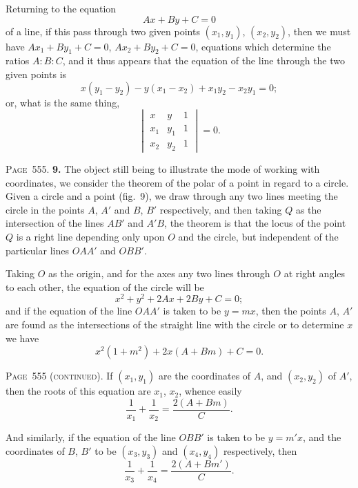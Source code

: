 \documentclass[11pt,a4paper]{book}
\begin{document}
Returning to the equation
\[
Ax+By+C=0
\]
of a line, if this pass through two given points $(x_1,y_1)$, $(x_2,y_2)$, then we must have $Ax_1+By_1+C=0$, $Ax_2+By_2+C=0$, equations which determine the ratios $A:B:C$, and it thus appears that the equation of the line through the two given points is
\[
x(y_1-y_2) - y(x_1-x_2) + x_1y_2 - x_2y_1 = 0;
\]
or, what is the same thing,
\[
\begin{vmatrix}
x & y & 1 \\
x_1 & y_1 & 1 \\
x_2 & y_2 & 1
\end{vmatrix} = 0.
\]

\newpage
\noindent\textsc{Page~555.} \textbf{9.} The object still being to illustrate the mode of working with coordinates, we consider the theorem of the polar of a point in regard to a circle. Given a circle and a point (fig.~9), we draw through any two lines meeting the circle in the points $A$, $A'$ and $B$, $B'$ respectively, and then taking $Q$ as the intersection of the lines $AB'$ and $A'B$, the theorem is that the locus of the point $Q$ is a right line depending only upon $O$ and the circle, but independent of the particular lines $OAA'$ and $OBB'$.

Taking $O$ as the origin, and for the axes any two lines through $O$ at right angles to each other, the equation of the circle will be
\[
x^2 + y^2 + 2Ax + 2By + C = 0;
\]
and if the equation of the line $OAA'$ is taken to be $y=mx$, then the points $A$, $A'$ are found as the intersections of the straight line with the circle or to determine $x$ we have
\[
x^2(1+m^2) + 2x(A+Bm) + C = 0.
\]

\noindent\textsc{Page~555 (continued).} If $(x_1,y_1)$ are the coordinates of $A$, and $(x_2,y_2)$ of $A'$, then the roots of this equation are $x_1$, $x_2$, whence easily
\[
\frac{1}{x_1} + \frac{1}{x_2} = \frac{2(A+Bm)}{C}.
\]

And similarly, if the equation of the line $OBB'$ is taken to be $y=m'x$, and the coordinates of $B$, $B'$ to be $(x_3,y_3)$ and $(x_4,y_4)$ respectively, then
\[
\frac{1}{x_3} + \frac{1}{x_4} = \frac{2(A+Bm')}{C}.
\]
\end{document}
